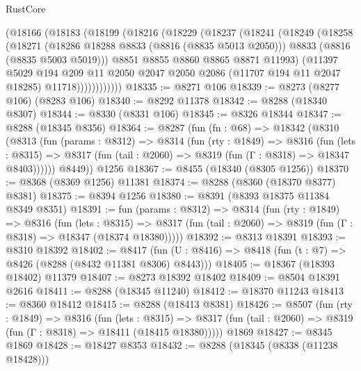 \begin{lexlean}{RustCore}
\begin{coremodule}
          (@18166
            (@18183
              (@18199
                (@18216
                  (@18229
                    (@18237
                      (@18241
                        (@18249
                          (@18258
                            (@18271
                              (@18286 @18288 @8833 (@8816 (@8835 @5013 @2050)))
                              @8833
                              (@8816 (@8835 @5003 @5019)))
                            @8851
                            @8855
                            @8860
                            @8865
                            @8871
                            @11993)
                          (@11397
                            @5029
                            @194
                            @209
                            @11
                            @2050
                            @2047
                            @2050
                            @2086
                            (@11707 @194 @11 @2047 @18285)
                            @11718))))))))))))
@18335 := @8271 @106
@18339 := @8273 (@8277 @106) (@8283 @106)
@18340 := @8292 @11378
@18342 := @8288 (@18340 @8307)
@18344 := @8330 (@8331 @106)
@18345 := @8326 @18344
@18347 := @8288 (@18345 @8356)
@18364 := @8287
    (fun (fn : @68) =>
    @18342
      (@8310
        (@8313
          (fun (params : @8312) =>
          @8314
            (fun (rty : @1849) =>
            @8316
              (fun (lets : @8315) =>
              @8317 (fun (tail : @2060) => @8319 (fun (Γ : @8318) => @18347 @8403))))))
        @8449))
    @1256
@18367 := @8455 (@18340 (@8305 @1256))
@18370 := @8368 (@8369 @1256) @11381
@18374 := @8288 (@8360 (@18370 @8377) @8381)
@18375 := @8394 @1256
@18380 := @8391 (@8393 @18375 @11384 @8349 @8351)
@18391 := fun (params : @8312) =>
  @8314
    (fun (rty : @1849) =>
    @8316
      (fun (lets : @8315) =>
      @8317 (fun (tail : @2060) => @8319 (fun (Γ : @8318) => @18347 (@18374 @18380)))))
@18392 := @8313 @18391
@18393 := @8310 @18392
@18402 := @8417
    (fun (U : @8416) => @8418 (fun (t : @7) => @8426 (@8288 (@8432 @11381 @8306) @8443)))
@18405 := @18367 (@18393 @18402) @11379
@18407 := @8273 @18392 @18402
@18409 := @8504 @18391 @2616
@18411 := @8288 (@18345 @11240)
@18412 := @18370 @11243
@18413 := @8360 @18412
@18415 := @8288 (@18413 @8381)
@18426 := @8507
    (fun (rty : @1849) =>
    @8316
      (fun (lets : @8315) =>
      @8317 (fun (tail : @2060) => @8319 (fun (Γ : @8318) => @18411 (@18415 @18380)))))
    @1869
@18427 := @8345 @1869
@18428 := @18427 @8353
@18432 := @8288 (@18345 (@8338 (@11238 @18428)))

\end{coremodule}
\end{lexlean}
